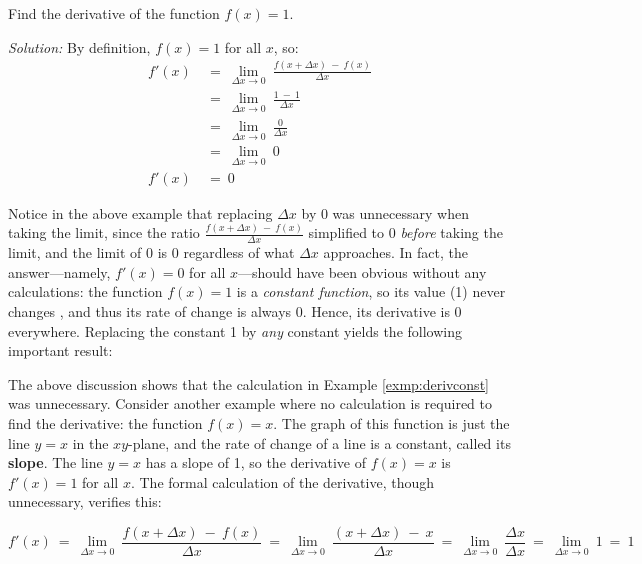 \begin{exmp}\label{exmp:derivconst}
 Find the derivative of the function $f(x) = 1$.\vspace{1mm}
 \par\noindent\emph{Solution:} By definition, $f(x) = 1$ for all $x$, so:
 \begin{align*}
  f'(x) ~&=~ \lim_{\Delta x \to 0} ~\frac{f(x+\Delta x) ~-~ f(x)}
   {\Delta x}\\[6pt]
  &=~ \lim_{\Delta x \to 0} ~\frac{1 ~-~ 1}{\Delta x}\\[6pt]
  &=~ \lim_{\Delta x \to 0} ~\frac{0}{\Delta x}\\[6pt]
  &=~ \lim_{\Delta x \to 0} ~0\\[4pt]
  f'(x) ~&=~ 0
 \end{align*}
\end{exmp}
\divider
\newpage
Notice in the above example that replacing $\Delta x$ by $0$ was unnecessary when
taking the limit, since the ratio $\frac{f(x + \Delta x) ~-~ f(x)}{\Delta x}$
simplified to 0 \emph{before} taking the limit, and the limit of 0 is 0
regardless of what $\Delta x$ approaches. In fact, the answer---namely,
$f'(x) = 0$ for all $x$---should have been obvious
without any calculations: the function $f(x) = 1$ is a
\emph{constant function}, so
its value (1) never changes , and thus its rate of change
is always 0. Hence, its derivative is 0 everywhere. Replacing the
constant 1 by \emph{any} constant yields the following important result:

The above discussion shows that the calculation in Example
\ref{exmp:derivconst} was unnecessary. Consider another example where no
calculation is required to find the derivative: the function $f(x) = x$. The
graph of this function is just the line $y = x$ in the $xy$-plane, and
the rate of change of a line is a constant, called its
\textbf{slope}. The line $y = x$ has a slope of 1, so the derivative
of $f(x) = x$ is $f'(x) = 1$ for all $x$. The formal calculation of the
derivative, though unnecessary, verifies this:

\begin{displaymath}
 f'(x) ~=~ \lim_{\Delta x \to 0} ~\frac{f(x+\Delta x) ~-~ f(x)}{\Delta x} ~=~
  \lim_{\Delta x \to 0} ~\frac{(x + \Delta x) ~-~ x}{\Delta x} ~=~
  \lim_{\Delta x \to 0} ~\frac{\Delta x}{\Delta x} ~=~
  \lim_{\Delta x \to 0} ~1 ~=~ 1
\end{displaymath}

